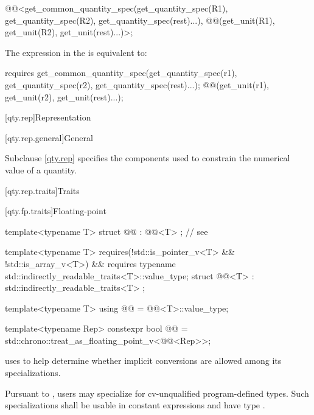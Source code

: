 \begin{itemdescr}
\pnum
\returns
\begin{codeblock}
@@<get_common_quantity_spec(get_quantity_spec(R1{}), get_quantity_spec(R2{}),
                                     get_quantity_spec(rest)...),
            @@(get_unit(R1{}), get_unit(R2{}), get_unit(rest)...)>{};
\end{codeblock}

\pnum
\remarks
The expression in the  is equivalent to:
\begin{codeblock}
requires {
  get_common_quantity_spec(get_quantity_spec(r1), get_quantity_spec(r2),
                           get_quantity_spec(rest)...);
  @@(get_unit(r1), get_unit(r2), get_unit(rest)...);
}
\end{codeblock}
\end{itemdescr}

[qty.rep]{Representation}

[qty.rep.general]{General}

\pnum
Subclause \ref{qty.rep} specifies the components
used to constrain the numerical value of a quantity.

[qty.rep.traits]{Traits}

[qty.fp.traits]{Floating-point}

\begin{itemdecl}
template<typename T>
struct @@ : @@<T> {}; // see 

template<typename T>
  requires(!std::is_pointer_v<T> && !std::is_array_v<T>) &&
          requires { typename std::indirectly_readable_traits<T>::value_type; }
struct @@<T> : std::indirectly_readable_traits<T> {};

template<typename T>
using @@ = @@<T>::value_type;

template<typename Rep>
constexpr bool @@ =
  std::chrono::treat_as_floating_point_v<@@<Rep>>;
\end{itemdecl}

\begin{itemdescr}
\pnum
{} uses 
to help determine whether implicit conversions are allowed among its specializations.

\pnum
\remarks
Pursuant to ,
users may specialize 
for cv-unqualified program-defined types.
Such specializations shall be usable in constant expressions
and have type .
\end{itemdescr}

